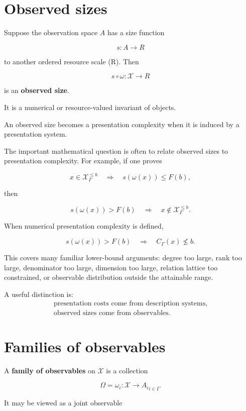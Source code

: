 \documentclass[11pt]{article}
\begin{document}
\section{Observed sizes}

Suppose the observation space \(A\) has a size function

\[
s:A\to R
\]

to another ordered resource scale (R). Then

\[
s\circ\omega:\mathcal X\to R
\]

is an \textbf{observed size}.

It is a numerical or resource-valued invariant of objects.

An observed size becomes a presentation complexity when it is induced by a presentation system.

The important mathematical question is often to relate observed sizes to presentation complexity. For example, if one proves

\[
x\in\mathcal X_\Gamma^{\leq b}
\quad\Longrightarrow\quad
s(\omega(x))\leq F(b),
\]

then

\[
s(\omega(x))>F(b)
\quad\Longrightarrow\quad
x\notin\mathcal X_\Gamma^{\leq b}.
\]

When numerical presentation complexity is defined,

\[
s(\omega(x))>F(b)
\quad\Longrightarrow\quad
C_\Gamma(x)\nleq b.
\]

This covers many familiar lower-bound arguments: degree too large, rank too large, denominator too large, dimension too large, relation lattice too constrained, or observable distribution outside the attainable range.

A useful distinction is:
\[
\begin{gathered}
\text{presentation costs come from description systems,}\\
\text{observed sizes come from observables.}
\end{gathered}
\]


\section{Families of observables}

A \textbf{family of observables} on \(\mathcal X\) is a collection

\[
\Omega={\omega_i:\mathcal X\to A_i}_{i\in I}.
\]

It may be viewed as a joint observable
\end{document}
